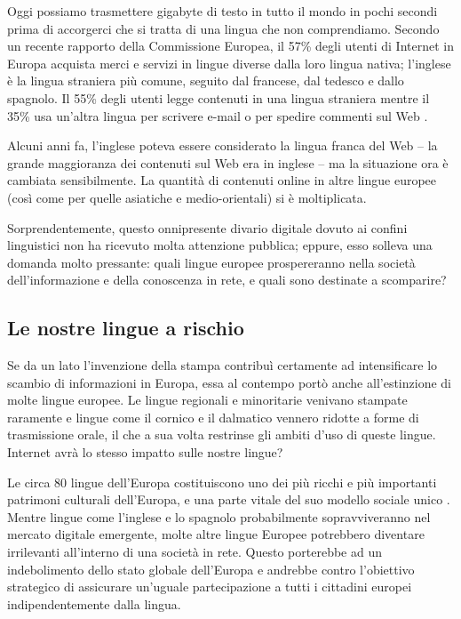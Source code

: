 \begin{multicols}{2}

Oggi possiamo trasmettere gigabyte di testo in tutto il mondo in pochi secondi
prima di accorgerci che si tratta di una lingua che non comprendiamo. Secondo
un recente rapporto della Commissione Europea, il 57\% degli utenti di
Internet in Europa acquista merci e servizi in lingue diverse dalla loro lingua nativa; l'inglese \`{e} la lingua straniera pi\`{u} comune, seguito dal francese, dal tedesco e dallo spagnolo. Il 55\% degli utenti legge contenuti in una lingua straniera mentre il 35\% usa un'altra lingua per scrivere e-mail o per spedire commenti sul Web \cite{EC1}.

Alcuni anni fa, l'inglese poteva essere considerato la lingua franca del Web -- la grande maggioranza dei contenuti sul Web era in inglese -- ma la situazione ora \`{e} cambiata sensibilmente. La quantit\`{a} di contenuti online in altre lingue europee (cos\`{i} come per quelle asiatiche e medio-orientali) si \`{e} moltiplicata.

Sorprendentemente, questo onnipresente divario digitale dovuto ai confini linguistici non ha ricevuto molta attenzione pubblica; eppure, esso solleva una domanda molto pressante: quali lingue europee prospereranno nella societ\`{a} dell'informazione e della conoscenza in rete, e quali sono destinate a scomparire?

\subsection{Le nostre lingue a rischio}

Se da un lato l'invenzione della stampa contribu\`{i} certamente ad intensificare lo scambio di informazioni in Europa, essa al contempo port\`{o} anche all'estinzione di molte lingue europee. Le lingue regionali e minoritarie venivano stampate raramente e lingue come il cornico e il dalmatico vennero ridotte a forme di trasmissione orale, il che a sua volta restrinse gli ambiti d'uso di queste lingue. Internet avr\`{a} lo stesso impatto sulle nostre lingue?


Le circa 80 lingue dell'Europa costituiscono uno dei pi\`{u} ricchi e pi\`{u}
importanti patrimoni culturali dell'Europa, e una parte vitale del suo 
modello sociale unico \cite{EC2}. Mentre lingue come l'inglese e lo spagnolo
probabilmente sopravviveranno nel mercato digitale emergente, molte altre
lingue Europee potrebbero diventare irrilevanti all'interno di una societ\`{a}
in rete. Questo porterebbe ad un indebolimento dello stato globale dell'Europa
e andrebbe contro l'obiettivo strategico di assicurare un'uguale
partecipazione a tutti i cittadini europei indipendentemente dalla
lingua. 


\end{multicols}
